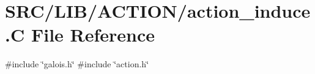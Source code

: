 \hypertarget{action__induce_8_c}{}\section{S\+R\+C/\+L\+I\+B/\+A\+C\+T\+I\+O\+N/action\+\_\+induce.C File Reference}
\label{action__induce_8_c}
{\ttfamily \#include \char`\"{}galois.\+h\char`\"{}}\newline
{\ttfamily \#include \char`\"{}action.\+h\char`\"{}}\newline
